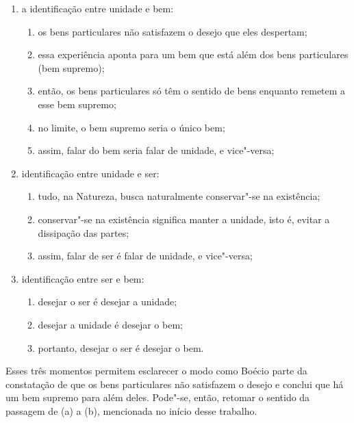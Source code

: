 \begin{enumerate}
\item a identificação entre unidade e bem:

\begin{enumerate}
\item os bens particulares não satisfazem o desejo que eles
despertam;

\item essa experiência aponta para um bem que está além dos bens
particulares (bem supremo);

\item então, os bens particulares só têm o sentido de bens
enquanto remetem a esse bem supremo;

\item no limite, o bem supremo seria o único bem;

\item assim, falar do bem seria falar de unidade, e vice"-versa;
\end{enumerate}

\item identificação entre unidade e ser:

\begin{enumerate}
\item tudo, na Natureza, busca naturalmente conservar"-se na
existência;

\item conservar"-se na existência significa manter a unidade,
isto é, evitar a dissipação das partes;

\item assim, falar de ser é falar de unidade, e vice"-versa;
\end{enumerate}

\item identificação entre ser e bem:

\begin{enumerate}
\item desejar o ser é desejar a unidade;

\item desejar a unidade é desejar o bem;

\item portanto, desejar o ser é desejar o bem.
\end{enumerate}
\end{enumerate}

Esses três momentos permitem esclarecer o modo como Boécio parte
da constatação de que os bens particulares não satisfazem o
desejo e conclui que há um bem supremo para além deles. Pode"-se,
então, retomar o sentido da passagem de (a) a (b), mencionada no
início desse trabalho.

